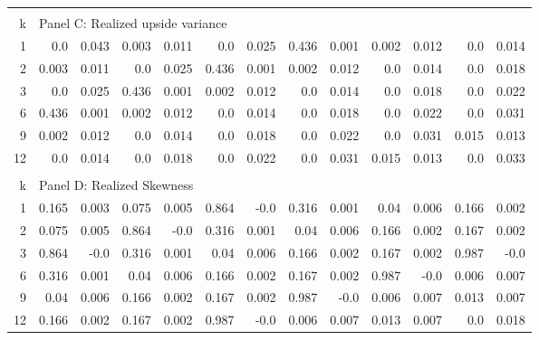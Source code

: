 \documentclass{article}
\begin{document}
\begin{center}
\begin{tabular}{@{\extracolsep{6pt}}rrrrrrrrrrrrr@{}}
\hline\\[0.000000001pt]

k & \multicolumn{12}{l}{Panel C: Realized upside variance} \\[7pt]

\hline

1 & 0.0 & 0.043 & 0.003 & 0.011 & 0.0 & 0.025 & 0.436 & 0.001 & 0.002 & 0.012 & 0.0 & 0.014 \\[6pt]
2 & 0.003 & 0.011 & 0.0 & 0.025 & 0.436 & 0.001 & 0.002 & 0.012 & 0.0 & 0.014 & 0.0 & 0.018 \\[6pt]
3 & 0.0 & 0.025 & 0.436 & 0.001 & 0.002 & 0.012 & 0.0 & 0.014 & 0.0 & 0.018 & 0.0 & 0.022 \\[6pt]
6 & 0.436 & 0.001 & 0.002 & 0.012 & 0.0 & 0.014 & 0.0 & 0.018 & 0.0 & 0.022 & 0.0 & 0.031 \\[6pt]
9 & 0.002 & 0.012 & 0.0 & 0.014 & 0.0 & 0.018 & 0.0 & 0.022 & 0.0 & 0.031 & 0.015 & 0.013 \\[6pt]
12 & 0.0 & 0.014 & 0.0 & 0.018 & 0.0 & 0.022 & 0.0 & 0.031 & 0.015 & 0.013 & 0.0 & 0.033 \\[6pt]


\hline\\[0.000000001pt]

k & \multicolumn{12}{l}{Panel D: Realized Skewness} \\[7pt]

\hline

1 & 0.165 & 0.003 & 0.075 & 0.005 & 0.864 & -0.0 & 0.316 & 0.001 & 0.04 & 0.006 & 0.166 & 0.002 \\[6pt]
2 & 0.075 & 0.005 & 0.864 & -0.0 & 0.316 & 0.001 & 0.04 & 0.006 & 0.166 & 0.002 & 0.167 & 0.002 \\[6pt]
3 & 0.864 & -0.0 & 0.316 & 0.001 & 0.04 & 0.006 & 0.166 & 0.002 & 0.167 & 0.002 & 0.987 & -0.0 \\[6pt]
6 & 0.316 & 0.001 & 0.04 & 0.006 & 0.166 & 0.002 & 0.167 & 0.002 & 0.987 & -0.0 & 0.006 & 0.007 \\[6pt]
9 & 0.04 & 0.006 & 0.166 & 0.002 & 0.167 & 0.002 & 0.987 & -0.0 & 0.006 & 0.007 & 0.013 & 0.007 \\[6pt]
12 & 0.166 & 0.002 & 0.167 & 0.002 & 0.987 & -0.0 & 0.006 & 0.007 & 0.013 & 0.007 & 0.0 & 0.018 \\[6pt]


\hline

\end{tabular}
\hspace*{-3cm}
\end{center}
\end{document}
